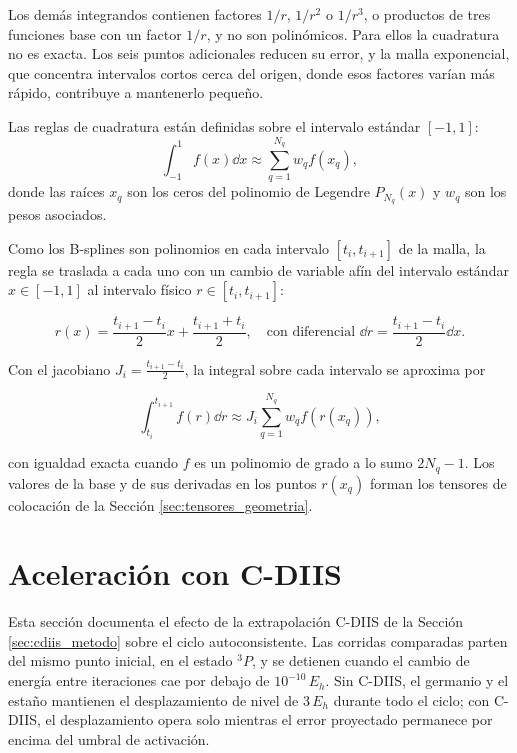 Los demás integrandos contienen factores $1/r$, $1/r^2$ o $1/r^3$, o productos de tres funciones base con un factor $1/r$, y no son polinómicos. Para ellos la cuadratura no es exacta. Los seis puntos adicionales reducen su error, y la malla exponencial, que concentra intervalos cortos cerca del origen, donde esos factores varían más rápido, contribuye a mantenerlo pequeño.

Las reglas de cuadratura están definidas sobre el intervalo estándar $[-1, 1]$:
\begin{equation}
    \int_{-1}^{1} f(x) \dd{x} \approx \sum_{q=1}^{N_q} w_q f(x_q),
\end{equation}
donde las raíces $x_q$ son los ceros del polinomio de Legendre $P_{N_q}(x)$ y $w_q$ son los pesos asociados.

Como los B-splines son polinomios en cada intervalo $[t_i, t_{i+1}]$ de la malla, la regla se traslada a cada uno con un cambio de variable afín del intervalo estándar $x \in [-1, 1]$ al intervalo físico $r \in [t_i, t_{i+1}]$:

\begin{equation}
    r(x) = \frac{t_{i+1} - t_i}{2} x + \frac{t_{i+1} + t_i}{2}, \quad \text{con diferencial } \dd{r} = \frac{t_{i+1} - t_i}{2} \dd{x}.
\end{equation}

Con el jacobiano $J_i = \frac{t_{i+1} - t_i}{2}$, la integral sobre cada intervalo se aproxima por

\begin{equation}
    \int_{t_i}^{t_{i+1}} f(r) \dd{r} \approx J_i \sum_{q=1}^{N_q} w_q f(r(x_q)),
\end{equation}

con igualdad exacta cuando $f$ es un polinomio de grado a lo sumo $2N_q - 1$. Los valores de la base y de sus derivadas en los puntos $r(x_q)$ forman los tensores de colocación de la Sección \ref{sec:tensores_geometria}.

\section{Aceleración con C-DIIS}
\label{sec:cdiis_resultados}

Esta sección documenta el efecto de la extrapolación C-DIIS de la Sección \ref{sec:cdiis_metodo} sobre el ciclo autoconsistente. Las corridas comparadas parten del mismo punto inicial, en el estado $^3P$, y se detienen cuando el cambio de energía entre iteraciones cae por debajo de $10^{-10}\,E_h$. Sin C-DIIS, el germanio y el estaño mantienen el desplazamiento de nivel de $3\,E_h$ durante todo el ciclo; con C-DIIS, el desplazamiento opera solo mientras el error proyectado permanece por encima del umbral de activación.

